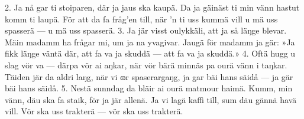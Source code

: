 2.  Ja nå gar ti stoiparen,
    där ja jaus ska kaupä.
    Da ja gäinäst ti min vänn
    hastut komm ti laupä.
    För att da fa fråg’en till,
    när ’n ti uss kummä vill
    u mä uss spasserä — u mä uss spasserä.
3.  Ja jär visst oulykkäli,
    att ja så läŋge blevar.
    Mäin madamm ha frågar mi,
    um ja na yvagivar.
    Jaugä för madamm ja gär:
    »Ja fikk läŋge väntä där,
    att fa va ja skuddä — att fa va ja skuddä.»
4.  Oftä hugg u slag vör va —
    därpa vör ai aŋkar,
    när vör bärä minnäs pa
    ourä vänn i taŋkar.
    Täiden jär da aldri laŋg,
    när vi ɷr spaserargaŋg,
    ja gar bäi hans säidå — ja gär bäi hans säidå.
5.  Nestä sunndag da bläir ai
    ourä matmour haimä.
    Kumm, min vänn, däu ska fa staik,
    för ja jär allenä.
    Ja vi lagä kaffi till,
    sum däu gännä havä vill.
    Vör ska uss trakterä — vör ska uss trakterä.
